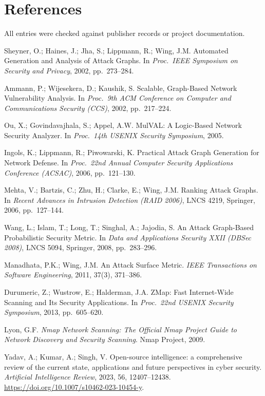\documentclass[11pt,a4paper]{article}
\begin{document}
\section{References}\label{app:refs}
All entries were checked against publisher records or project documentation.
\begin{enumerate}[leftmargin=*,label={[\arabic*]}]
\item Sheyner, O.; Haines, J.; Jha, S.; Lippmann, R.; Wing, J.M. Automated Generation and Analysis of Attack Graphs. In \textit{Proc.\ IEEE Symposium on Security and Privacy}, 2002, pp.\ 273--284.
\item Ammann, P.; Wijesekera, D.; Kaushik, S. Scalable, Graph-Based Network Vulnerability Analysis. In \textit{Proc.\ 9th ACM Conference on Computer and Communications Security (CCS)}, 2002, pp.\ 217--224.
\item Ou, X.; Govindavajhala, S.; Appel, A.W. MulVAL: A Logic-Based Network Security Analyzer. In \textit{Proc.\ 14th USENIX Security Symposium}, 2005.
\item Ingols, K.; Lippmann, R.; Piwowarski, K. Practical Attack Graph Generation for Network Defense. In \textit{Proc.\ 22nd Annual Computer Security Applications Conference (ACSAC)}, 2006, pp.\ 121--130.
\item Mehta, V.; Bartzis, C.; Zhu, H.; Clarke, E.; Wing, J.M. Ranking Attack Graphs. In \textit{Recent Advances in Intrusion Detection (RAID 2006)}, LNCS 4219, Springer, 2006, pp.\ 127--144.
\item Wang, L.; Islam, T.; Long, T.; Singhal, A.; Jajodia, S. An Attack Graph-Based Probabilistic Security Metric. In \textit{Data and Applications Security XXII (DBSec 2008)}, LNCS 5094, Springer, 2008, pp.\ 283--296.
\item Manadhata, P.K.; Wing, J.M. An Attack Surface Metric. \textit{IEEE Transactions on Software Engineering}, 2011, 37(3), 371--386.
\item Durumeric, Z.; Wustrow, E.; Halderman, J.A. ZMap: Fast Internet-Wide Scanning and Its Security Applications. In \textit{Proc.\ 22nd USENIX Security Symposium}, 2013, pp.\ 605--620.
\item Lyon, G.F. \textit{Nmap Network Scanning: The Official Nmap Project Guide to Network Discovery and Security Scanning}. Nmap Project, 2009.
\item Yadav, A.; Kumar, A.; Singh, V. Open-source intelligence: a comprehensive review of the current state, applications and future perspectives in cyber security. \textit{Artificial Intelligence Review}, 2023, 56, 12407--12438. \url{https://doi.org/10.1007/s10462-023-10454-y}.

\end{enumerate}
\end{document}
